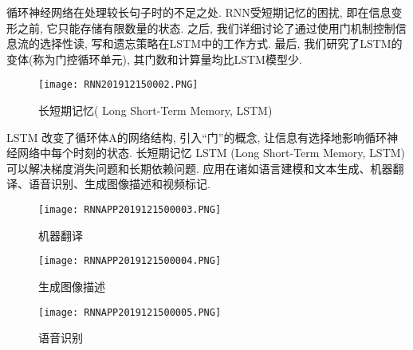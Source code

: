 循环神经网络在处理较长句子时的不足之处. RNN受短期记忆的困扰, 即在信息变形之前, 它只能存储有限数量的状态. 之后, 我们详细讨论了通过使用门机制控制信息流的选择性读, 写和遗忘策略在LSTM中的工作方式. 最后, 我们研究了LSTM的变体(称为门控循环单元), 其门数和计算量均比LSTM模型少.
\begin{figure}[H]
\centering
\texttt{[image: RNN201912150002.PNG]}
\caption{长短期记忆( Long Short-Term Memory,  LSTM)}
\label{RNN201912150002}\vspace{-0.4cm}
\end{figure}
LSTM 改变了循环体A的网络结构, 引入“门”的概念, 让信息有选择地影响循环神经网络中每个时刻的状态.
长短期记忆 LSTM (Long Short-Term Memory,  LSTM)可以解决梯度消失问题和长期依赖问题.
应用在诸如语言建模和文本生成、机器翻译、语音识别、生成图像描述和视频标记.
\begin{figure}[H]
\centering
\texttt{[image: RNNAPP2019121500003.PNG]}
\caption{机器翻译}
\label{RNNAPP2019121500003}\vspace{-0.4cm}
\end{figure}
\begin{figure}[H]
\centering
\texttt{[image: RNNAPP2019121500004.PNG]}
\caption{生成图像描述}
\label{RNNAPP2019121500005}\vspace{-0.4cm}
\end{figure}
\begin{figure}[H]
\centering
\texttt{[image: RNNAPP2019121500005.PNG]}
\caption{语音识别}
\label{RNNAPP2019121500005}\vspace{-0.4cm}
\end{figure}
